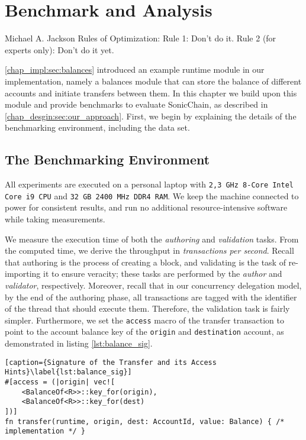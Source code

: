 \chapter{Benchmark and Analysis}  \label{chap:bench_analysis}

\begin{chapquote}{Michael A. Jackson}
	Rules of Optimization:
	Rule 1: Don't do it.
	Rule 2 (for experts only): Don't do it yet.
\end{chapquote}

\ref{chap_impl:sec:balances} introduced an example runtime module in our implementation, namely a
balances module that can store the balance of different accounts and initiate transfers between
them. In this chapter we build upon this module and provide benchmarks to evaluate SonicChain, as
described in \ref{chap_desgin:sec:our_approach}. First, we begin by explaining the details of the
benchmarking environment, including the data set.

\section{The Benchmarking Environment}

All experiments are executed on a personal laptop with \texttt{2,3 GHz 8-Core Intel Core i9 CPU} and
\texttt{32 GB 2400 MHz DDR4 RAM}. We keep the machine connected to power for consistent results, and
run no additional resource-intensive software while taking measurements.

We measure the execution time of both the \textit{authoring} and \textit{validation} tasks. From the
computed time, we derive the throughput in \textit{transactions per second}. Recall that authoring
is the process of creating a block, and validating is the task of re-importing it to ensure
veracity; these tasks are performed by the \textit{author} and \textit{validator}, respectively.
Moreover, recall that in our concurrency delegation model, by the end of the authoring phase, all
transactions are tagged with the identifier of the thread that should execute them. Therefore, the
validation task is fairly simpler. Furthermore, we set the \texttt{access} macro of the transfer
transaction to point to the account balance key of the \texttt{origin} and \texttt{destination}
account, as demonstrated in listing \ref{lst:balance_sig}.

\begin{lstlisting}[caption={Signature of the Transfer and its Access Hints}\label{lst:balance_sig}]
#[access = (|origin| vec![
	<BalanceOf<R>>::key_for(origin),
	<BalanceOf<R>>::key_for(dest)
])]
fn transfer(runtime, origin, dest: AccountId, value: Balance) { /* implementation */ }
\end{lstlisting}

